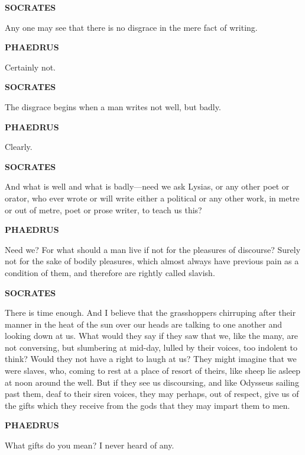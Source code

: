 \documentclass[11pt,letter]{article}
\begin{document}
\par \textbf{SOCRATES}
\par   Any one may see that there is no disgrace in the mere fact of writing.

\par \textbf{PHAEDRUS}
\par   Certainly not.

\par \textbf{SOCRATES}
\par   The disgrace begins when a man writes not well, but badly.

\par \textbf{PHAEDRUS}
\par   Clearly.

\par \textbf{SOCRATES}
\par   And what is well and what is badly—need we ask Lysias, or any other poet or orator, who ever wrote or will write either a political or any other work, in metre or out of metre, poet or prose writer, to teach us this?

\par \textbf{PHAEDRUS}
\par   Need we? For what should a man live if not for the pleasures of discourse? Surely not for the sake of bodily pleasures, which almost always have previous pain as a condition of them, and therefore are rightly called slavish.

\par \textbf{SOCRATES}
\par   There is time enough. And I believe that the grasshoppers chirruping after their manner in the heat of the sun over our heads are talking to one another and looking down at us. What would they say if they saw that we, like the many, are not conversing, but slumbering at mid-day, lulled by their voices, too indolent to think? Would they not have a right to laugh at us? They might imagine that we were slaves, who, coming to rest at a place of resort of theirs, like sheep lie asleep at noon around the well. But if they see us discoursing, and like Odysseus sailing past them, deaf to their siren voices, they may perhaps, out of respect, give us of the gifts which they receive from the gods that they may impart them to men.

\par \textbf{PHAEDRUS}
\par   What gifts do you mean? I never heard of any.
\end{document}
